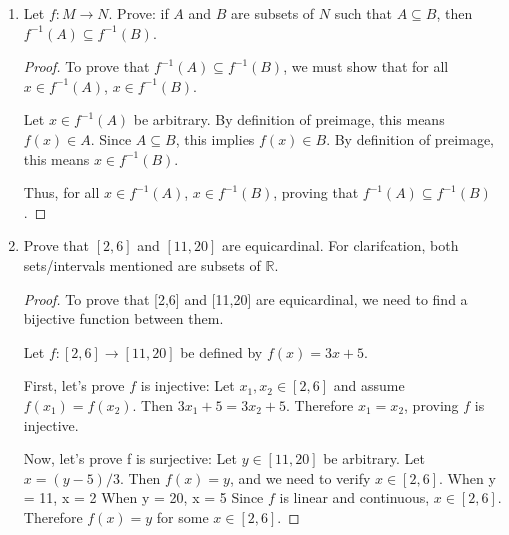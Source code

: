 \documentclass{article}
\begin{document}
\begin{enumerate}
\begin{proof}
              Thus, for all $m_1, m_2 \in M$, if $(g \circ f)(m_1) = (g \circ f)(m_2)$, then
              $m_1 = m_2$, proving that $g \circ f$ is injective.
          \end{proof}

          \newpage

    \item Let $f : M \to N$. Prove: if $A$ and $B$ are subsets of $N$ such that $A
              \subseteq B$, then $f^{-1}(A) \subseteq f^{-1}(B)$.

          \begin{proof}
              To prove that $f^{-1}(A) \subseteq f^{-1}(B)$, we must show that for all $x \in f^{-1}(A)$, $x \in f^{-1}(B)$.

              Let $x \in f^{-1}(A)$ be arbitrary. By definition of preimage, this means $f(x)
                  \in A$. Since $A \subseteq B$, this implies $f(x) \in B$. By definition of
              preimage, this means $x \in f^{-1}(B)$.

              Thus, for all $x \in f^{-1}(A)$, $x \in f^{-1}(B)$, proving that $f^{-1}(A)
                  \subseteq f^{-1}(B)$.
          \end{proof}

          \newpage

    \item Prove that $[2,6]$ and $[11,20]$ are equicardinal. For clarifcation, both
          sets/intervals mentioned are subsets of $\mathbb{R}$.

          \newpage

          \begin{proof}
              To prove that [2,6] and [11,20] are equicardinal, we need to find a bijective function between them.

              Let $f: [2,6] \rightarrow [11,20]$ be defined by $f(x) = 3x + 5$.

              First, let's prove $f$ is injective: Let $x_1, x_2 \in [2,6]$ and assume
              $f(x_1) = f(x_2)$. Then $3x_1 + 5 = 3x_2 + 5$. Therefore $x_1 = x_2$, proving
              $f$ is injective.

              Now, let's prove f is surjective: Let $y \in [11,20]$ be arbitrary. Let $x =
                  (y-5)/3$. Then $f(x) = y$, and we need to verify $x \in [2,6]$. When y = 11, x
              = 2 When y = 20, x = 5 Since $f$ is linear and continuous, $x \in [2,6]$.
              Therefore $f(x) = y$ for some $x \in [2,6]$.


\end{proof}
\end{enumerate}
\end{document}
